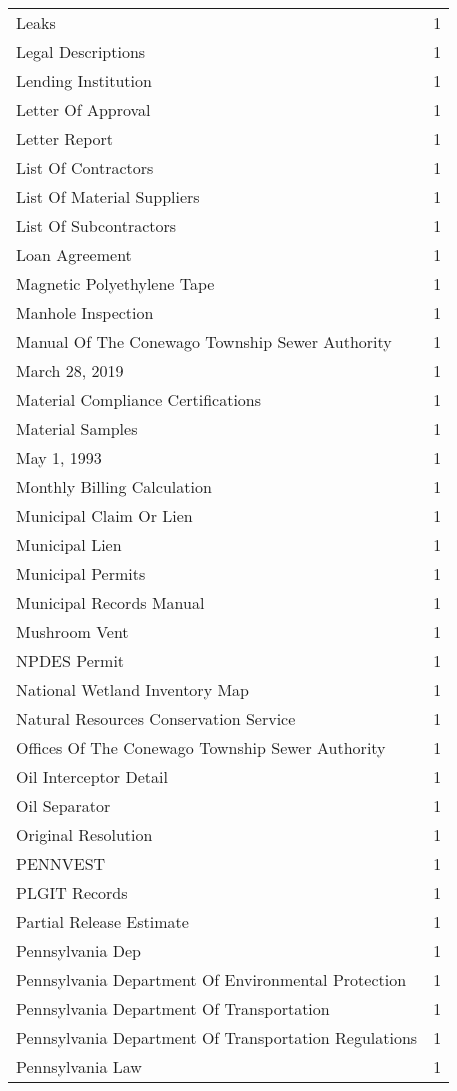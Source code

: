 \begin{longtable}{p{} p{}}
Leaks & 1 \\
Legal Descriptions & 1 \\
Lending Institution & 1 \\
Letter Of Approval & 1 \\
Letter Report & 1 \\
List Of Contractors & 1 \\
List Of Material Suppliers & 1 \\
List Of Subcontractors & 1 \\
Loan Agreement & 1 \\
Magnetic Polyethylene Tape & 1 \\
Manhole Inspection & 1 \\
Manual Of The Conewago Township Sewer Authority & 1 \\
March 28, 2019 & 1 \\
Material Compliance Certifications & 1 \\
Material Samples & 1 \\
May 1, 1993 & 1 \\
Monthly Billing Calculation & 1 \\
Municipal Claim Or Lien & 1 \\
Municipal Lien & 1 \\
Municipal Permits & 1 \\
Municipal Records Manual & 1 \\
Mushroom Vent & 1 \\
NPDES Permit & 1 \\
National Wetland Inventory Map & 1 \\
Natural Resources Conservation Service & 1 \\
Offices Of The Conewago Township Sewer Authority & 1 \\
Oil Interceptor Detail & 1 \\
Oil Separator & 1 \\
Original Resolution & 1 \\
PENNVEST & 1 \\
PLGIT Records & 1 \\
Partial Release Estimate & 1 \\
Pennsylvania Dep & 1 \\
Pennsylvania Department Of Environmental Protection & 1 \\
Pennsylvania Department Of Transportation & 1 \\
Pennsylvania Department Of Transportation Regulations & 1 \\
Pennsylvania Law & 1 \\

\end{longtable}

